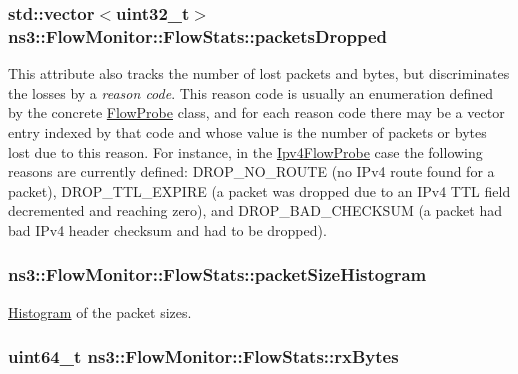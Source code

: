 \subsubsection[{\texorpdfstring{packets\+Dropped}{packetsDropped}}]{\setlength{\rightskip}{0pt plus 5cm}std\+::vector$<$uint32\+\_\+t$>$ ns3\+::\+Flow\+Monitor\+::\+Flow\+Stats\+::packets\+Dropped}\hypertarget{structns3_1_1FlowMonitor_1_1FlowStats_af510c5f6bd1958e48a7b3ad82984da43}{}\label{structns3_1_1FlowMonitor_1_1FlowStats_af510c5f6bd1958e48a7b3ad82984da43}
This attribute also tracks the number of lost packets and bytes, but discriminates the losses by a {\itshape reason code}. This reason code is usually an enumeration defined by the concrete \hyperlink{classns3_1_1FlowProbe}{Flow\+Probe} class, and for each reason code there may be a vector entry indexed by that code and whose value is the number of packets or bytes lost due to this reason. For instance, in the \hyperlink{classns3_1_1Ipv4FlowProbe}{Ipv4\+Flow\+Probe} case the following reasons are currently defined\+: D\+R\+O\+P\+\_\+\+N\+O\+\_\+\+R\+O\+U\+TE (no I\+Pv4 route found for a packet), D\+R\+O\+P\+\_\+\+T\+T\+L\+\_\+\+E\+X\+P\+I\+RE (a packet was dropped due to an I\+Pv4 T\+TL field decremented and reaching zero), and D\+R\+O\+P\+\_\+\+B\+A\+D\+\_\+\+C\+H\+E\+C\+K\+S\+UM (a packet had bad I\+Pv4 header checksum and had to be dropped). 
\subsubsection[{\texorpdfstring{packet\+Size\+Histogram}{packetSizeHistogram}}]{ ns3\+::\+Flow\+Monitor\+::\+Flow\+Stats\+::packet\+Size\+Histogram}\hypertarget{structns3_1_1FlowMonitor_1_1FlowStats_a2a68466756299240d4cc8397498e104b}{}\label{structns3_1_1FlowMonitor_1_1FlowStats_a2a68466756299240d4cc8397498e104b}


\hyperlink{classns3_1_1Histogram}{Histogram} of the packet sizes. 

\subsubsection[{\texorpdfstring{rx\+Bytes}{rxBytes}}]{\setlength{\rightskip}{0pt plus 5cm}uint64\+\_\+t ns3\+::\+Flow\+Monitor\+::\+Flow\+Stats\+::rx\+Bytes}\hypertarget{structns3_1_1FlowMonitor_1_1FlowStats_a9da466d3f73f946521be4a0964c403ad}{}\label{structns3_1_1FlowMonitor_1_1FlowStats_a9da466d3f73f946521be4a0964c403ad}


